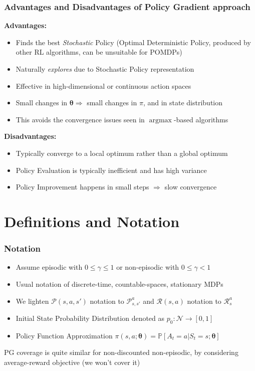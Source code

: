 \documentclass[handout]{beamer}
\DeclareMathOperator*{\argmax}{argmax}
\begin{document}
\begin{frame}
\frametitle{Advantages and Disadvantages of Policy Gradient approach}
\pause
{\bf Advantages:}
\pause
\begin{itemize}[<+->]
\item Finds the best {\em Stochastic} Policy (Optimal Deterministic Policy, produced by other RL algorithms, can be unsuitable for POMDPs)
\item Naturally {\em explores} due to Stochastic Policy representation
\item Effective in high-dimensional or continuous action spaces
\item Small changes in $\bm{\theta} \Rightarrow$ small changes in $\pi$, and in state distribution
\item This avoids the convergence issues seen in $\argmax$-based algorithms 
\end{itemize}
\pause
{\bf Disadvantages:}
\pause
\begin{itemize}[<+->]
\item Typically converge to a local optimum rather than a global optimum
\item Policy Evaluation is typically inefficient and has high variance
\item Policy Improvement happens in small steps $\Rightarrow$ slow convergence
\end{itemize}
\end{frame}

\section{Definitions and Notation}

\begin{frame}
\frametitle{Notation}
\pause
\begin{itemize}[<+->]
\item Assume episodic with $0 \leq \gamma \leq1$ or non-episodic with $0 \leq \gamma < 1$
\item Usual notation of discrete-time, countable-spaces, stationary MDPs
\item We lighten $\mathcal{P}(s,a,s')$ notation to $\mathcal{P}_{s,s'}^a$ and $\mathcal{R}(s,a)$ notation to $\mathcal{R}_s^a$
\item Initial State Probability Distribution denoted as $p_0 : \mathcal{N} \rightarrow [0,1]$
\item Policy Function Approximation $\pi(s,a;\bm{\theta}) = \mathbb{P}[A_t=a | S_t=s; \bm{\theta}]$
\end{itemize}
\pause
PG coverage is quite similar for non-discounted non-episodic, by considering average-reward objective (we won't cover it)
\end{frame}
\end{document}
